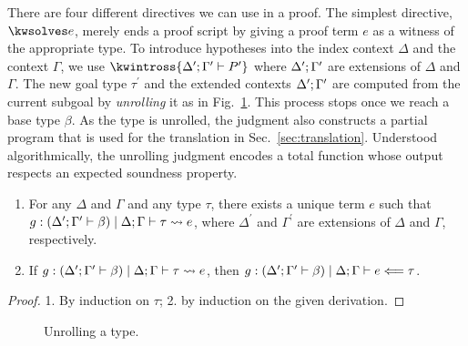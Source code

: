 There are four different directives we can use in a proof. The
simplest directive, $\kwsolves e$, merely ends a proof script by
giving a proof term $e$ as a witness of the appropriate type.
%
To introduce hypotheses into the index context $\Delta$ and the context
$\Gamma$, we use $\kwintross \hypoth{\goalctx{^\prime}}{P^\prime}$ where
$\Delta^\prime; \Gamma^\prime$ are extensions of $\Delta$ and $\Gamma$.
%
The new goal type $\tau^\prime$ and the extended contexts $\Delta^\prime; \Gamma^\prime$
are computed from the current subgoal by \emph{unrolling} it as in
Fig.~\ref{fig:unroll}.
This process stops once we reach a base type $\beta$.
As the type is unrolled, the judgment also constructs a partial program
that is used for the translation in Sec.~\ref{sec:translation}.
Understood algorithmically, the unrolling judgment encodes a total function
whose output respects an expected soundness property.
\begin{thm}
  \begin{enumerate}
  \item
    For any $\Delta$ and $\Gamma$ and any type $\tau$,
    there exists a unique term $e$ such that
    $g : (\Delta^\prime; \Gamma^\prime \vdash \beta) \mid \Delta; \Gamma \vdash \tau \rightsquigarrow e$, where
    $\Delta^\prime$ and $\Gamma^\prime$ are extensions of $\Delta$ and $\Gamma$,
    respectively.

  \item
    If $
    g : 
      (\Delta^\prime; \Gamma^\prime \vdash \beta)
     \mid \Delta; \Gamma \vdash \tau \rightsquigarrow e
    $, then $
    \belchkjudg{
      g : \goalwith{\goalctx{^\prime}}{\beta} \mid \goalctx{}
    }{e}{\tau}
    $.
  \end{enumerate}
\end{thm}
%
\begin{proof}
  1. By induction on $\tau$; 2. by induction on the given derivation.
\end{proof}

\begin{figure}[htp]
  \caption{Unrolling a \Beluga{} type.}%
  \label{fig:unroll}%
\end{figure}


